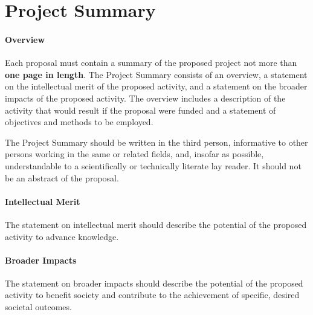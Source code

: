 \section{Project Summary}

\paragraph*{Overview}
Each proposal must contain a summary of the proposed project not more than {\bf one page in length}. The Project
Summary consists of an overview, a statement on the intellectual merit of the proposed activity, and a statement
on the broader impacts of the proposed activity.
The overview includes a description of the activity that would result if the proposal were funded and a statement
of objectives and methods to be employed.

The Project Summary should be written in the third person, informative to other persons working in
the same or related fields, and, insofar as possible, understandable to a scientifically or technically
literate lay reader. It should not be an abstract of the proposal.


\paragraph*{Intellectual Merit}
The statement on intellectual merit should describe the potential of the proposed activity to advance knowledge.

\paragraph*{Broader Impacts}
The statement on broader impacts should describe the potential of the proposed activity to benefit society and contribute to the achievement of specific, desired societal outcomes.
